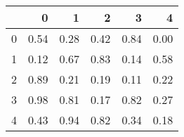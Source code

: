 \begin{tabular}{lrrrrr}
\toprule
 & 0 & 1 & 2 & 3 & 4 \\
\midrule
0 & 0.54 & 0.28 & 0.42 & 0.84 & 0.00 \\
1 & 0.12 & 0.67 & 0.83 & 0.14 & 0.58 \\
2 & 0.89 & 0.21 & 0.19 & 0.11 & 0.22 \\
3 & 0.98 & 0.81 & 0.17 & 0.82 & 0.27 \\
4 & 0.43 & 0.94 & 0.82 & 0.34 & 0.18 \\
\bottomrule
\end{tabular}

